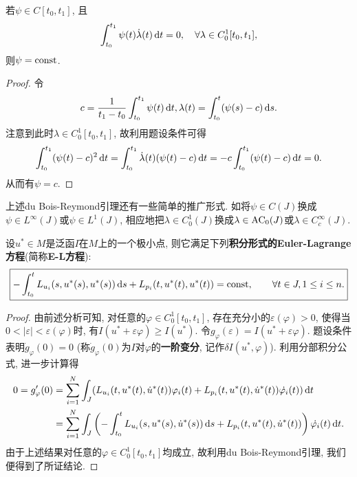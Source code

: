 \begin{lemma}
    若$\psi \in C[t_0, t_1]$, 且
    \begin{equation*}
        \int_{t_0}^{t_1} \psi(t)\dot{\lambda}(t) \,{\rm d}t = 0, \quad \forall \lambda \in C_0^1[t_0, t_1],
    \end{equation*}
    则$\psi = {\rm const}$.
    \begin{proof}
        令
        \begin{equation*}
            c = \frac{1}{t_1 - t_0}\int_{t_0}^{t_1}\psi(t) \,{\rm d}t, \lambda(t) = \int_{t_0}^t(\psi(s) - c) \,{\rm d}s.
        \end{equation*}
        注意到此时$\lambda \in C_0^1[t_0, t_1]$, 故利用题设条件可得 
        \begin{equation*}
            \int_{t_0}^{t_1}(\psi(t) - c)^2 \,{\rm d}t = \int_{t_0}^{t_1}\dot{\lambda}(t)(\psi(t) - c) \,{\rm d}t = -c\int_{t_0}^{t_1}(\psi(t) - c) \,{\rm d}t = 0.
        \end{equation*}
        从而有$\psi = c$.
    \end{proof}
\end{lemma}

\begin{remark}
    上述du Bois-Reymond引理还有一些简单的推广形式. 如将$\psi \in C(J)$换成$\psi \in L^{\infty}(J)$或$\psi \in L^1(J)$, 相应地把$\lambda \in C_0^1(J)$换成$\lambda \in {\rm AC_0}(J)$或$\lambda \in C_c^{\infty}(J)$.
\end{remark}

\begin{proposition}
    设$u^* \in M$是泛函$I$在$M$上的一个极小点, 则它满足下列\textbf{积分形式的Euler-Lagrange方程}(简称\textbf{E-L方程}):
    \begin{equation*}
        \boxed{-\int_{t_0}^tL_{u_i}(s, u^*(s) , u^*(s)) \,{\rm d}s + L_{p_i}(t, u^*(t) , u^*(t)) = {\rm const}, \qquad \forall t \in J, 1 \leq i \leq n.}
    \end{equation*}
    \begin{proof}
        由前述分析可知, 对任意的$\varphi \in C_0^1[t_0, t_1]$, 存在充分小的$\varepsilon(\varphi) > 0$, 使得当$0 < |\varepsilon| < \varepsilon(\varphi)$时, 有$I(u^* + \varepsilon\varphi) \geq I(u^*)$.
        令$g_{\varphi}(\varepsilon) = I(u^* + \varepsilon\varphi)$. 题设条件表明$\dot g_{\varphi}(0) = 0$ (称$\dot g_{\varphi}(0)$为$I$对$\varphi$的\textbf{一阶变分}, 记作$\delta I(u^*, \varphi)$).
        利用分部积分公式, 进一步计算得
        \begin{align*}
            0 = g_{\varphi}'(0) &= \sum\limits_{i = 1}^N\int_J(L_{u_i}(t, u^*(t) , \dot u^*(t))\varphi_i(t) + L_{p_i}(t, u^*(t) , \dot u^*(t))\dot{\varphi_i}(t)) \,{\rm d}t \\  
            &= \sum\limits_{i = 1}^N\int_J\left(-\int_{t_0}^tL_{u_i}(s, u^*(s) , \dot u^*(s)) \,{\rm d}s + L_{p_i}(t, u^*(t) , \dot u^*(t))\right)\dot{\varphi_i}(t) \,{\rm d}t.
        \end{align*}
        由于上述结果对任意的$\varphi \in C_0^1[t_0, t_1]$均成立, 故利用du Bois-Reymond引理, 我们便得到了所证结论.
    \end{proof}
\end{proposition}

